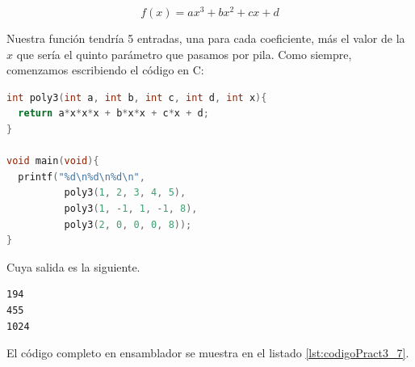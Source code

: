 \begin{equation}
f(x) = ax^3 + bx^2 + cx + d
\label{eq:polinomio}
\end{equation}


Nuestra función tendría 5 entradas, una para cada coeficiente, más el valor de la $x$ que
sería el quinto parámetro que pasamos por pila. Como siempre, comenzamos escribiendo el código en C:

\begin{lstlisting}[caption={Evaluador de polinomios subrut5.c},label={lst:codigoPract3_65},language=C]
int poly3(int a, int b, int c, int d, int x){
  return a*x*x*x + b*x*x + c*x + d;
}

void main(void){
  printf("%d\n%d\n%d\n",
          poly3(1, 2, 3, 4, 5), 
          poly3(1, -1, 1, -1, 8), 
          poly3(2, 0, 0, 0, 8));
}
\end{lstlisting}

Cuya salida es la siguiente.

\begin{lstlisting}
194
455
1024
\end{lstlisting}

El código completo en ensamblador se muestra en el listado \ref{lst:codigoPract3_7}.

